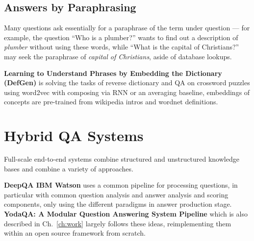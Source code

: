 %
%
%
%
%

\subsection{Answers by Paraphrasing}

Many questions ask essentially for a paraphrase of the term under
question --- for example, the question ``Who is a plumber?'' wants
to find out a description of \textit{plumber} without using these
words, while ``What is the capital of Christians?'' may seek the
paraphrase of \textit{capital of Christians}, aside of database lookups.

\textbf{Learning to Understand Phrases by Embedding the Dictionary (DefGen)} \citep{DefGen}
	is solving the tasks of reverse dictionary and QA on crossword puzzles
	using word2vec
	with composing via RNN or an averaging baseline, embeddings of
	concepts are pre-trained from wikipedia intros and wordnet definitions.



\section{Hybrid QA Systems}

Full-scale end-to-end systems combine structured and unstructured knowledge bases
and combine a variety of approaches.

\textbf{DeepQA IBM Watson} \citep{WatsonOverview}
uses a common pipeline for processing questions, in particular
with common question analysis and answer analysis and scoring components,
only using the different paradigms in answer production stage.
\textbf{YodaQA: A Modular Question Answering System Pipeline} \citep{YodaQAPoster2015}
which is also described in Ch.~\ref{ch:work} largely follows these ideas,
reimplementing them within an open source framework from scratch.

